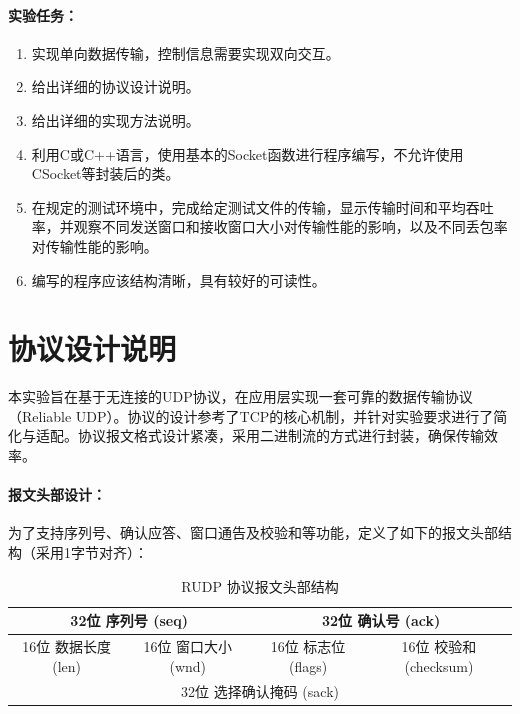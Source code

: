 \documentclass[a4paper]{article}
\begin{document}
	\paragraph{实验任务：}
	\begin{enumerate}
		\item 实现单向数据传输，控制信息需要实现双向交互。
		\item 给出详细的协议设计说明。
		\item 给出详细的实现方法说明。
		\item 利用C或C++语言，使用基本的Socket函数进行程序编写，不允许使用CSocket等封装后的类。
		\item 在规定的测试环境中，完成给定测试文件的传输，显示传输时间和平均吞吐率，并观察不同发送窗口和接收窗口大小对传输性能的影响，以及不同丢包率对传输性能的影响。
		\item 编写的程序应该结构清晰，具有较好的可读性。
	\end{enumerate}
	
	\section{协议设计说明}
	本实验旨在基于无连接的UDP协议，在应用层实现一套可靠的数据传输协议（Reliable UDP）。协议的设计参考了TCP的核心机制，并针对实验要求进行了简化与适配。协议报文格式设计紧凑，采用二进制流的方式进行封装，确保传输效率。
	
	\paragraph{报文头部设计：}
	为了支持序列号、确认应答、窗口通告及校验和等功能，定义了如下的报文头部结构（采用1字节对齐）：
	
	\begin{table}[H]
		\centering
		\begin{tabular}{|c|c|c|c|}
			\hline
			\multicolumn{2}{|c|}{32位 序列号 (seq)} & \multicolumn{2}{c|}{32位 确认号 (ack)} \\ \hline
			16位 数据长度 (len) & 16位 窗口大小 (wnd) & 16位 标志位 (flags) & 16位 校验和 (checksum) \\ \hline
			\multicolumn{4}{|c|}{32位 选择确认掩码 (sack)} \\ \hline
		\end{tabular}
		\caption{RUDP 协议报文头部结构}
	\end{table}
	
\end{document}
